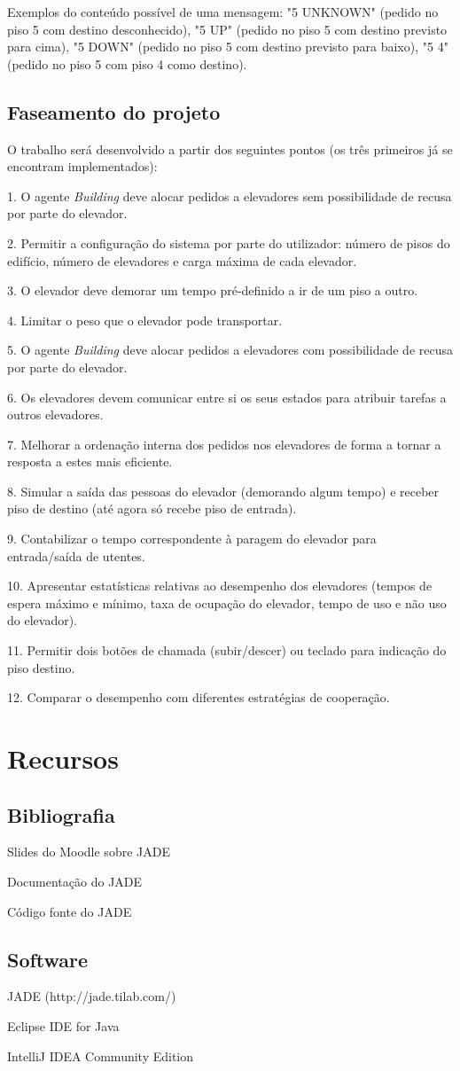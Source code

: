 \documentclass[a4paper]{article}
\begin{document}
Exemplos do conteúdo possível de uma mensagem: "5 UNKNOWN" (pedido no piso 5 com destino desconhecido), "5 UP" (pedido no piso 5 com destino previsto para cima), "5 DOWN" (pedido no piso 5 com destino previsto para baixo), "5 4" (pedido no piso 5 com piso 4 como destino).

\subsection{Faseamento do projeto} 

O trabalho será desenvolvido a partir dos seguintes pontos (os três primeiros já se encontram implementados):

1. O agente \textit{Building} deve alocar pedidos a elevadores sem possibilidade de recusa por parte do elevador.

2. Permitir a configuração do sistema por parte do utilizador: número de pisos do edifício, número de elevadores e carga máxima de cada elevador.

3. O elevador deve demorar um tempo pré-definido a ir de um piso a outro.

4. Limitar o peso que o elevador pode transportar.

5. O agente \textit{Building} deve alocar pedidos a elevadores com possibilidade de recusa por parte do elevador.

6. Os elevadores devem comunicar entre si os seus estados para atribuir tarefas a outros elevadores.

7. Melhorar a ordenação interna dos pedidos nos elevadores de forma a tornar a resposta a estes mais eficiente.

8. Simular a saída das pessoas do elevador (demorando algum tempo) e receber piso de destino (até agora só recebe piso de entrada).

9. Contabilizar o tempo correspondente à paragem do elevador para entrada/saída de utentes.

10. Apresentar estatísticas relativas ao desempenho dos elevadores (tempos de espera máximo e mínimo, taxa de ocupação do elevador, tempo de uso e não uso do elevador).

11. Permitir dois botões de chamada (subir/descer) ou teclado para indicação do piso destino.

12. Comparar o desempenho com diferentes estratégias de cooperação.

\newpage

\section{Recursos}

\subsection{Bibliografia} 

Slides do Moodle sobre JADE

Documentação do JADE

Código fonte do JADE

\subsection{Software} 

JADE (http://jade.tilab.com/)

Eclipse IDE for Java

IntelliJ IDEA Community Edition
\end{document}
